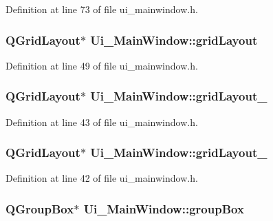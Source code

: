 \-Definition at line 73 of file ui\-\_\-mainwindow.\-h.

\hypertarget{class_ui___main_window_a525ed3c5fe0784ac502ee222fba4e205}{
\subsubsection[{grid\-Layout}]{\setlength{\rightskip}{0pt plus 5cm}\-Q\-Grid\-Layout$\ast$ {\bf \-Ui\-\_\-\-Main\-Window\-::grid\-Layout}}}\label{class_ui___main_window_a525ed3c5fe0784ac502ee222fba4e205}


\-Definition at line 49 of file ui\-\_\-mainwindow.\-h.

\hypertarget{class_ui___main_window_a6b2a0c5f7e8ff2a87134908dd770d2d2}{
\subsubsection[{grid\-Layout\-\_\-2}]{\setlength{\rightskip}{0pt plus 5cm}\-Q\-Grid\-Layout$\ast$ {\bf \-Ui\-\_\-\-Main\-Window\-::grid\-Layout\-\_}}}\label{class_ui___main_window_a6b2a0c5f7e8ff2a87134908dd770d2d2}


\-Definition at line 43 of file ui\-\_\-mainwindow.\-h.

\hypertarget{class_ui___main_window_af42ea7d4c2e893181caad21e28166932}{
\subsubsection[{grid\-Layout\-\_\-3}]{\setlength{\rightskip}{0pt plus 5cm}\-Q\-Grid\-Layout$\ast$ {\bf \-Ui\-\_\-\-Main\-Window\-::grid\-Layout\-\_}}}\label{class_ui___main_window_af42ea7d4c2e893181caad21e28166932}


\-Definition at line 42 of file ui\-\_\-mainwindow.\-h.

\hypertarget{class_ui___main_window_aef7cb3be8cecfc9aaf98f036a98781ce}{
\subsubsection[{group\-Box}]{\setlength{\rightskip}{0pt plus 5cm}\-Q\-Group\-Box$\ast$ {\bf \-Ui\-\_\-\-Main\-Window\-::group\-Box}}}\label{class_ui___main_window_aef7cb3be8cecfc9aaf98f036a98781ce}


